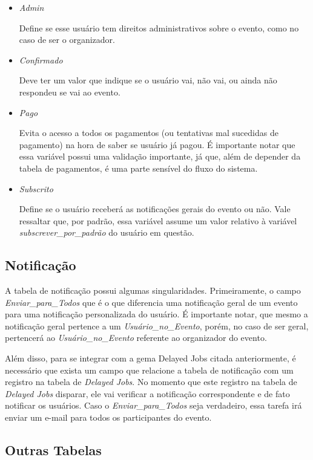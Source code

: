 \begin{itemize}
\item \textit{Admin}

Define se esse usuário tem direitos administrativos sobre o evento, como no caso de ser o organizador.

\item \textit{Confirmado}

Deve ter um valor que indique se o usuário vai, não vai, ou ainda não respondeu se vai ao evento.

\item \textit{Pago}

Evita o acesso a todos os pagamentos (ou tentativas mal sucedidas de pagamento) na hora de saber se usuário já pagou. É importante notar que essa variável possui uma validação importante, já que, além de depender da tabela de pagamentos, é uma parte sensível do fluxo do sistema.

\item \textit{Subscrito}

Define se o usuário receberá as notificações gerais do evento ou não. Vale ressaltar que, por padrão, essa variável assume um valor relativo à variável \textit{subscrever\_por\_padrão} do usuário em questão.
\end{itemize}

\subsection{Notificação}

A tabela de notificação possui algumas singularidades. Primeiramente, o campo \textit{Enviar\_para\_Todos} que é o que diferencia uma notificação geral de um evento para uma notificação personalizada do usuário. É importante notar, que mesmo a notificação geral pertence a um \textit{Usuário\_no\_Evento}, porém, no caso de ser geral, pertencerá ao \textit{Usuário\_no\_Evento} referente ao organizador do evento.

Além disso, para se integrar com a gema Delayed Jobs citada anteriormente, é necessário que exista um campo que relacione a tabela de notificação com um registro na tabela de \textit{Delayed Jobs}. No momento que este registro na tabela de \textit{Delayed Jobs} disparar, ele vai verificar a notificação correspondente e de fato notificar os usuários. Caso o \textit{Enviar\_para\_Todos} seja verdadeiro, essa tarefa irá enviar um e-mail para todos os participantes do evento.

\subsection{Outras Tabelas}

